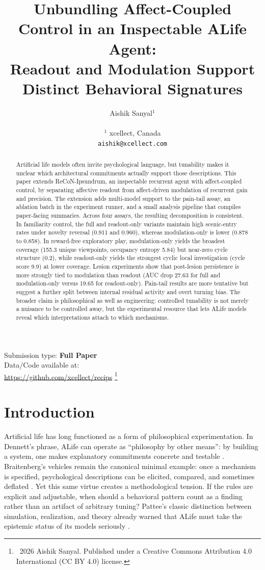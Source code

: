 \documentclass[letterpaper]{article}
\title{Unbundling Affect-Coupled Control in an Inspectable ALife Agent:\\Readout and Modulation Support Distinct Behavioral Signatures}
\author{
Aishik Sanyal$^{1}$ \\
\mbox{}\\
$^1$ xcellect, Canada \\
\texttt{aishik@xcellect.com}
}
\newcommand\blfootnote[1]{%
  \begingroup
  \renewcommand\thefootnote{}\footnote{#1}%
  \addtocounter{footnote}{-1}%
  \endgroup
}
\begin{document}
\maketitle

\begin{abstract}
Artificial life models often invite psychological language, but tunability makes it unclear which architectural commitments actually support those descriptions. This paper extends ReCoN-Ipsundrum, an inspectable recurrent agent with affect-coupled control, by separating affective readout from affect-driven modulation of recurrent gain and precision. The extension adds multi-model support to the pain-tail assay, an ablation batch in the experiment runner, and a small analysis pipeline that compiles paper-facing summaries. Across four assays, the resulting decomposition is consistent. In familiarity control, the full and readout-only variants maintain high scenic-entry rates under novelty reversal (0.911 and 0.960), whereas modulation-only is lower (0.878 to 0.858). In reward-free exploratory play, modulation-only yields the broadest coverage (155.3 unique viewpoints, occupancy entropy 5.84) but near-zero cycle structure (0.2), while readout-only yields the strongest cyclic local investigation (cycle score 9.9) at lower coverage. Lesion experiments show that post-lesion persistence is more strongly tied to modulation than readout (AUC drop 27.63 for full and modulation-only versus 19.65 for readout-only). Pain-tail results are more tentative but suggest a further split between internal residual activity and overt turning bias. The broader claim is philosophical as well as engineering: controlled tunability is not merely a nuisance to be controlled away, but the experimental resource that lets ALife models reveal which interpretations attach to which mechanisms.
\end{abstract}

Submission type: \textbf{Full Paper}\\
Data/Code available at:\\
\url{https://github.com/xcellect/recips}
\blfootnote{\textcopyright\ 2026 Aishik Sanyal. Published under a Creative Commons Attribution 4.0 International (CC BY 4.0) license.}

\section{Introduction}
Artificial life has long functioned as a form of philosophical experimentation. In Dennett's phrase, ALife can operate as ``philosophy by other means'': by building a system, one makes explanatory commitments concrete and testable \citep{Dennett1994ArtificialLifePhilosophy}. Braitenberg's vehicles remain the canonical minimal example: once a mechanism is specified, psychological descriptions can be elicited, compared, and sometimes deflated \citep{Braitenberg1984Vehicles}. Yet this same virtue creates a methodological tension. If the rules are explicit and adjustable, when should a behavioral pattern count as a finding rather than an artifact of arbitrary tuning? Pattee's classic distinction between simulation, realization, and theory already warned that ALife must take the epistemic status of its models seriously \citep{Pattee1989Simulations}.
\end{document}
